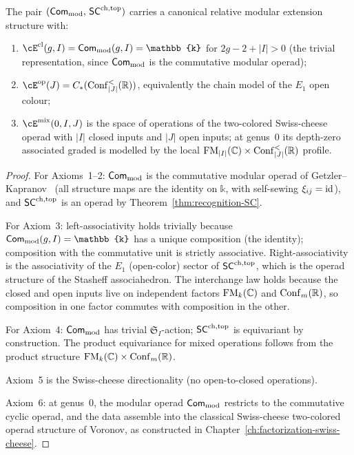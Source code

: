 \begin{proposition}
\label{prop:standard-relative-extension}
The pair $(\mathsf{Com}_{\mathrm{mod}},\, \mathsf{SC}^{\mathrm{ch,top}})$ carries a
canonical relative modular extension structure with:
\begin{enumerate}[label=\textup{(\roman*)}]
\item $\cE^{\mathrm{cl}}(g,I) = \Com_{\mathrm{mod}}(g,I)
 = \mathbb{k}$ for $2g - 2 + |I| > 0$
 \textup{(}the trivial representation, since
 $\mathsf{Com}_{\mathrm{mod}}$ is the commutative modular
 operad\textup{)};
\item $\cE^{\mathrm{op}}(J) =
 C_\ast(\Conf^{<}_{|J|}(\R))$, equivalently the chain model of
 the $E_1$ open colour;
\item $\cE^{\mathrm{mix}}(0,I,J)$ is the space of
 operations of the two-colored Swiss-cheese operad with
 $|I|$ closed inputs and $|J|$ open inputs; at genus~$0$ its
 depth-zero associated graded is modelled by the local
 $\operatorname{FM}_{|I|}(\mathbb{C})\times\operatorname{Conf}^{<}_{|J|}(\mathbb{R})$ profile.
\end{enumerate}
\end{proposition}

\begin{proof}
For Axioms~1--2: $\mathsf{Com}_{\mathrm{mod}}$ is the commutative
modular operad of Getzler--Kapranov~\cite{GK98} (all structure
maps are the identity on $\mathbb{k}$, with self-sewing
$\xi_{ij} = \operatorname{id}$), and $\mathsf{SC}^{\mathrm{ch,top}}$ is an operad by
Theorem~\ref{thm:recognition-SC}.

For Axiom~3: left-associativity holds trivially because
$\Com_{\mathrm{mod}}(g,I) = \mathbb{k}$ has a unique
composition (the identity); composition with the
commutative unit is strictly associative.
Right-associativity is the associativity of the $E_1$
(open-color) sector of $\mathsf{SC}^{\mathrm{ch,top}}$, which is the operad
structure of the Stasheff associahedron. The interchange
law holds because the closed and open inputs live on
independent factors $\operatorname{FM}_k(\mathbb{C})$ and $\operatorname{Conf}_m(\mathbb{R})$, so
composition in one factor commutes with composition in the
other.

For Axiom~4: $\mathsf{Com}_{\mathrm{mod}}$ has trivial
$\mathfrak{S}_I$-action; $\mathsf{SC}^{\mathrm{ch,top}}$ is equivariant by
construction. The product equivariance for mixed operations
follows from the product structure
$\operatorname{FM}_k(\mathbb{C}) \times \operatorname{Conf}_m(\mathbb{R})$.

Axiom~5 is the Swiss-cheese directionality
(no open-to-closed operations).

Axiom~6: at genus~$0$, the modular operad
$\mathsf{Com}_{\mathrm{mod}}$ restricts to the commutative cyclic
operad, and the data assemble into the classical Swiss-cheese
two-colored operad structure of Voronov, as constructed in
Chapter~\ref{ch:factorization-swiss-cheese}.
\end{proof}

